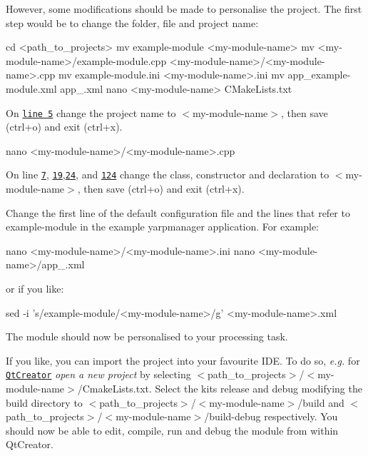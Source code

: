 However, some modifications should be made to personalise the project. The first step would be to change the folder, file and project name\+: 
\begin{DoxyCode}
cd <path\_to\_projects>
mv example-module <my-module-name>
mv <my-module-name>/example-module.cpp <my-module-name>/<my-module-name>.cpp
mv example-module.ini <my-module-name>.ini
mv app\_example-module.xml app\_<my-module-name>.xml
nano <my-module-name> CMakeLists.txt
\end{DoxyCode}
 On \href{https://github.com/robotology/event-driven/blob/99a1f941141b33266900e034d3e7789d55fd0d99/documentation/example-module/CMakeLists.txt#L5}{\tt line 5} change the project name to {\ttfamily $<$my-\/module-\/name$>$}, then save ({\ttfamily ctrl+o}) and exit ({\ttfamily ctrl+x}). 
\begin{DoxyCode}
nano <my-module-name>/<my-module-name>.cpp
\end{DoxyCode}
 On line \href{https://github.com/robotology/event-driven/blob/99a1f941141b33266900e034d3e7789d55fd0d99/documentation/example-module/example-module.cpp#L7}{\tt 7}, \href{https://github.com/robotology/event-driven/blob/99a1f941141b33266900e034d3e7789d55fd0d99/documentation/example-module/example-module.cpp#L19}{\tt 19},\href{https://github.com/robotology/event-driven/blob/99a1f941141b33266900e034d3e7789d55fd0d99/documentation/example-module/example-module.cpp#L24}{\tt 24}, and \href{https://github.com/robotology/event-driven/blob/99a1f941141b33266900e034d3e7789d55fd0d99/documentation/example-module/example-module.cpp#L124}{\tt 124} change the class, constructor and declaration to {\ttfamily $<$my-\/module-\/name$>$}, then save ({\ttfamily ctrl+o}) and exit ({\ttfamily ctrl+x}).

Change the first line of the default configuration file and the lines that refer to {\ttfamily example-\/module} in the example {\ttfamily yarpmanager} application. For example\+:


\begin{DoxyCode}
nano <my-module-name>/<my-module-name>.ini
nano <my-module-name>/app\_<my-module-name>.xml
\end{DoxyCode}


or if you like\+:


\begin{DoxyCode}
sed -i 's/example-module/<my-module-name>/g' <my-module-name>.xml
\end{DoxyCode}


The module should now be personalised to your processing task.

If you like, you can import the project into your favourite I\+DE. To do so, {\itshape e.\+g.} for \href{https://www.qt.io/product}{\tt Qt\+Creator} {\itshape open a new project} by selecting {\ttfamily $<$path\+\_\+to\+\_\+projects$>$/$<$my-\/module-\/name$>$/\+Cmake\+Lists.txt}. Select the kits {\ttfamily release} and {\ttfamily debug} modifying the build directory to {\ttfamily $<$path\+\_\+to\+\_\+projects$>$/$<$my-\/module-\/name$>$/build} and {\ttfamily $<$path\+\_\+to\+\_\+projects$>$/$<$my-\/module-\/name$>$/build-\/debug} respectively. You should now be able to edit, compile, run and debug the module from within Qt\+Creator. 